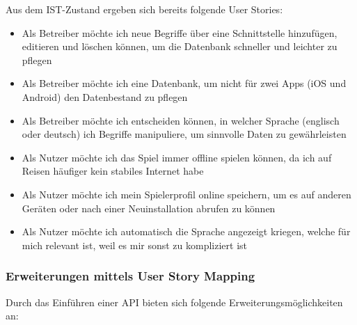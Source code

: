 {Aus dem IST-Zustand ergeben sich bereits folgende User Stories: 

\begin{itemize}
	\item Als Betreiber möchte ich neue Begriffe über eine Schnittstelle hinzufügen, editieren und löschen können, um die Datenbank schneller und leichter zu pflegen
	\item Als Betreiber möchte ich eine Datenbank, um nicht für zwei Apps (iOS und Android) den Datenbestand zu pflegen
	\item Als Betreiber möchte ich entscheiden können, in welcher Sprache (englisch oder deutsch) ich Begriffe manipuliere, um sinnvolle Daten zu gewährleisten
	\item Als Nutzer möchte ich das Spiel immer offline spielen können, da ich auf Reisen häufiger kein stabiles Internet habe
	\item Als Nutzer möchte ich mein Spielerprofil online speichern, um es auf anderen Geräten oder nach einer Neuinstallation abrufen zu können
	\item Als Nutzer möchte ich automatisch die Sprache angezeigt kriegen, welche für mich relevant ist, weil es mir sonst zu kompliziert ist
\end{itemize}

\subsubsection{Erweiterungen mittels User Story Mapping}

Durch das Einführen einer API bieten sich folgende Erweiterungsmöglichkeiten an:

}
